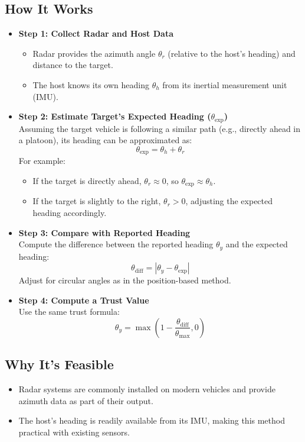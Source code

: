 \documentclass{article}
\begin{document}
\subsection*{How It Works}
\begin{itemize}
    \item \textbf{Step 1: Collect Radar and Host Data} \\
    \begin{itemize}
        \item Radar provides the azimuth angle \(\theta_r\) (relative to the host's heading) and distance to the target.
        \item The host knows its own heading \(\theta_h\) from its inertial measurement unit (IMU).
    \end{itemize}

    \item \textbf{Step 2: Estimate Target's Expected Heading (\(\theta_{\text{exp}}\))} \\
    Assuming the target vehicle is following a similar path (e.g., directly ahead in a platoon), its heading can be approximated as:
    \[
    \theta_{\text{exp}} = \theta_h + \theta_r
    \]
    For example:
    \begin{itemize}
        \item If the target is directly ahead, \(\theta_r \approx 0\), so \(\theta_{\text{exp}} \approx \theta_h\).
        \item If the target is slightly to the right, \(\theta_r > 0\), adjusting the expected heading accordingly.
    \end{itemize}

    \item \textbf{Step 3: Compare with Reported Heading} \\
    Compute the difference between the reported heading \(\theta_y\) and the expected heading:
    \[
    \theta_{\text{diff}} = |\theta_y - \theta_{\text{exp}}|
    \]
    Adjust for circular angles as in the position-based method.

    \item \textbf{Step 4: Compute a Trust Value} \\
    Use the same trust formula:
    \[
    \theta_y = \max\left(1 - \frac{\theta_{\text{diff}}}{\theta_{\text{max}}}, 0\right)
    \]
\end{itemize}

\subsection*{Why It's Feasible}
\begin{itemize}
    \item Radar systems are commonly installed on modern vehicles and provide azimuth data as part of their output.
    \item The host's heading is readily available from its IMU, making this method practical with existing sensors.
\end{itemize}
\end{document}
